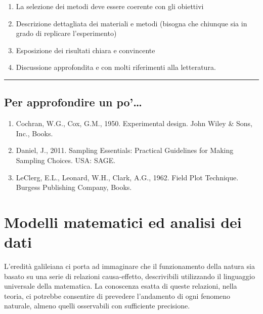 \documentclass[a4paper,12pt,oneside]{book}
\providecommand{\tightlist}{%
  \setlength{\itemsep}{0pt}\setlength{\parskip}{0pt}}
\begin{document}
\begin{enumerate}
\def\labelenumi{\arabic{enumi}.}
\tightlist
\item
  La selezione dei metodi deve essere coerente con gli obiettivi
\item
  Descrizione dettagliata dei materiali e metodi (bisogna che chiunque sia in grado di replicare l'esperimento)
\item
  Esposizione dei risultati chiara e convincente
\item
  Discussione approfondita e con molti riferimenti alla letteratura.
\end{enumerate}

\begin{center}\rule{0.5\linewidth}{\linethickness}\end{center}

\hypertarget{per-approfondire-un-po-1}{%
\section{Per approfondire un po'\ldots{}}\label{per-approfondire-un-po-1}}

\begin{enumerate}
\def\labelenumi{\arabic{enumi}.}
\tightlist
\item
  Cochran, W.G., Cox, G.M., 1950. Experimental design. John Wiley \& Sons, Inc., Books.
\item
  Daniel, J., 2011. Sampling Essentials: Practical Guidelines for Making Sampling Choices. USA: SAGE.
\item
  LeClerg, E.L., Leonard, W.H., Clark, A.G., 1962. Field Plot Technique. Burgess Publishing Company, Books.
\end{enumerate}

\hypertarget{modelli-matematici-ed-analisi-dei-dati}{%
\chapter{Modelli matematici ed analisi dei dati}\label{modelli-matematici-ed-analisi-dei-dati}}

L'eredità galileiana ci porta ad immaginare che il funzionamento della natura sia basato su una serie di relazioni causa-effetto, descrivibili utilizzando il linguaggio universale della matematica. La conoscenza esatta di queste relazioni, nella teoria, ci potrebbe consentire di prevedere l'andamento di ogni fenomeno naturale, almeno quelli osservabili con sufficiente precisione.
\end{document}
